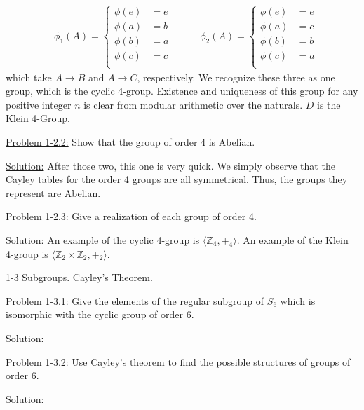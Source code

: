 \documentclass[12pt]{article}
\begin{document}
\begin{align*}
    &\phi_1(A) = \begin{cases}
                \phi(e) &= e\\
                \phi(a) &= b\\
                \phi(b) &= a\\
                \phi(c) &= c\\
                \end{cases} \quad \quad 
    &\phi_2(A) = \begin{cases}
                \phi(e) &= e\\
                \phi(a) &= c\\
                \phi(b) &= b\\
                \phi(c) &= a\\
                \end{cases}
\end{align*}
which take $A \rightarrow B$ and $A \rightarrow C$, respectively. We recognize
these three as one group, which is the cyclic 4-group. Existence and uniqueness
of this group for any positive integer $n$ is clear from modular arithmetic
over the naturals. $D$ is the Klein 4-Group.

\underline{Problem 1-2.2:} Show that the group of order 4 is Abelian.

\underline{Solution:} After those two, this one is very quick. We simply
observe that the Cayley tables for the order 4 groups are all symmetrical.
Thus, the groups they represent are Abelian.

\underline{Problem 1-2.3:} Give a realization of each group of order 4.

\underline{Solution:} An example of the cyclic 4-group is
$\langle \mathbb{Z}_4 , +_4 \rangle$. An example of the Klein 4-group is
$\langle \mathbb{Z}_2 \times \mathbb{Z}_2 , +_2 \rangle $.

1-3 Subgroups. Cayley's Theorem.

\underline{Problem 1-3.1:} Give the elements of the regular subgroup of $S_6$
which is isomorphic with the cyclic group of order 6.

\underline{Solution:}

\underline{Problem 1-3.2:} Use Cayley's theorem to find the possible structures
of groups of order 6.

\underline{Solution:}
\end{document}
